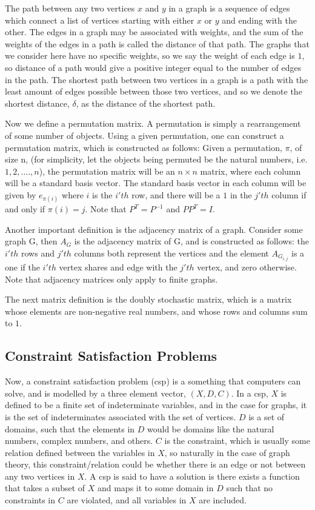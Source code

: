 \documentclass[12pt]{article}
\begin{document}
The path between any two vertices $x$ and $y$ in a graph is a sequence of edges which connect a list of vertices starting with either $x$ or $y$ and ending with the other. The edges in a graph may be associated with weights, and the sum of the weights of the edges in a path is called the distance of that path. The graphs that we consider here have no specific weights, so we say the weight of each edge is $1$, so distance of a path would give a positive integer equal to the number of edges in the path. The shortest path between two vertices in a graph is a path with the least amount of edges possible between those two vertices, and so we denote the shortest distance, $\delta$, as the distance of the shortest path. 


Now we define a permutation matrix. A permutation is simply a rearrangement of some number of objects. Using a given permutation, one can construct a permutation matrix, which is constructed as follows: Given a permutation, $\pi$, of size n, (for simplicity, let the objects being permuted be the natural numbers, i.e. $1, 2, ...., n$), the permutation matrix will be an $n \times n$ matrix, where each column will be a standard basis vector. The standard basis vector in each column will be given by $e_{\pi(i)}$ where $i$ is the $i'th$ row, and there will be a $1$ in the $j'th$ column if and only if $\pi(i) = j$. Note that $P^T = P^{-1}$ and $PP^T = I$. 

Another important definition is the adjacency matrix of a graph. Consider some graph G, then $A_G$ is the adjacency matrix of G, and is constructed as follows: the $i'th$ rows and $j'th$ columns both represent the vertices and the element $A_{G_{i, j}}$ is a one if the $i'th$ vertex shares and edge with the $j'th$ vertex, and zero otherwise. Note that adjacency matrices only apply to finite graphs.

The next matrix definition is the \hypertarget{stochastic}{doubly stochastic matrix}, which is a matrix whose elements are non-negative real numbers, and whose rows and columns sum to $1$.

\subsection{Constraint Satisfaction Problems}
Now, a constraint satisfaction problem (csp) is a something that computers can solve, and is modelled by a three element vector, $(X, D, C)$. In a csp, $X$ is defined to be a finite set of indeterminate variables, and in the case for graphs, it is the set of indeterminates associated with the set of vertices. $D$ is a set of domains, such that the elements in $D$ would be domains like the natural numbers, complex numbers, and others. $C$ is the constraint, which is usually some relation defined between the variables in $X$, so naturally in the case of graph theory, this constraint/relation could be whether there is an edge or not between any two vertices in $X$. A csp is said to have a solution is there exists a function that takes a subset of $X$ and maps it to some domain in $D$ such that no constraints in $C$ are violated, and all variables in $X$ are included.
\end{document}
